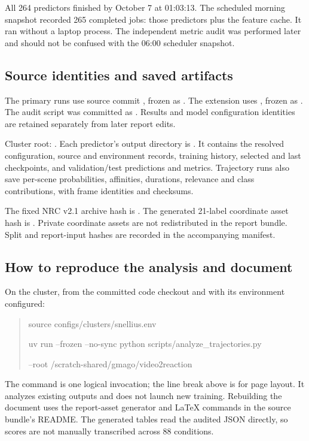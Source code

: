 \documentclass[11pt,a4paper]{article}
\begin{document}
All 264 predictors finished by October 7 at 01:03:13. The scheduled morning snapshot recorded 265 completed jobs: those predictors plus the feature cache. It ran without a laptop process. The independent metric audit was performed later and should not be confused with the 06:00 scheduler snapshot.

\subsection{Source identities and saved artifacts}
The primary runs use source commit , frozen as . The extension uses , frozen as . The audit script was committed as . Results and model configuration identities are retained separately from later report edits.

Cluster root: . Each predictor's output directory is . It contains the resolved configuration, source and environment records, training history, selected and last checkpoints, and validation/test predictions and metrics. Trajectory runs also save per-scene probabilities, affinities, durations, relevance and class contributions, with frame identities and checksums.

The fixed NRC v2.1 archive hash is . The generated 21-label coordinate asset hash is . Private coordinate assets are not redistributed in the report bundle. Split and report-input hashes are recorded in the accompanying manifest.

\subsection{How to reproduce the analysis and document}
On the cluster, from the committed code checkout and with its environment configured:
\begin{quote}\small\ttfamily
source configs/clusters/snellius.env\par
uv run --frozen --no-sync python scripts/analyze\_trajectories.py\par
\hspace*{1em}--root /scratch-shared/gmago/video2reaction
\end{quote}
The command is one logical invocation; the line break above is for page layout. It analyzes existing outputs and does not launch new training. Rebuilding the document uses the report-asset generator and LaTeX commands in the source bundle's README. The generated tables read the audited JSON directly, so scores are not manually transcribed across 88 conditions.
\end{document}
